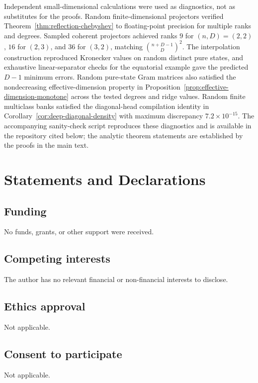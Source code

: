 \documentclass[pdflatex,sn-mathphys,NameDate,iicol]{sn-jnl}
\begin{document}
Independent small-dimensional calculations were used as diagnostics, not as
substitutes for the proofs. Random finite-dimensional projectors verified
Theorem~\ref{thm:reflection-chebyshev} to floating-point precision for
multiple ranks and degrees. Sampled coherent projectors achieved ranks
$9$ for $(n,D)=(2,2)$, $16$ for $(2,3)$, and $36$ for $(3,2)$, matching
$\binom{n+D-1}{D}^2$. The interpolation construction reproduced Kronecker
values on random distinct pure states, and exhaustive linear-separator checks
for the equatorial example gave the predicted $D-1$ minimum errors. Random
pure-state Gram matrices also satisfied the nondecreasing effective-dimension
property in Proposition~\ref{prop:effective-dimension-monotone} across the
tested degrees and ridge values. Random finite multiclass banks satisfied the
diagonal-head compilation identity in
Corollary~\ref{cor:deep-diagonal-density} with maximum discrepancy
$7.2\times10^{-15}$. The accompanying sanity-check script reproduces these
diagnostics and is available in the repository cited below; the analytic
theorem statements are established by the proofs in the main text.

\section*{Statements and Declarations}

\subsection*{Funding}
No funds, grants, or other support were received.

\subsection*{Competing interests}
The author has no relevant financial or non-financial interests to disclose.

\subsection*{Ethics approval}
Not applicable.

\subsection*{Consent to participate}
Not applicable.
\end{document}
